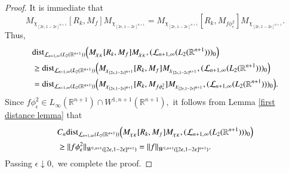 \documentclass[12pt]{amsart}
\begin{document}
\begin{proof}
It is immediate that
$$M_{\chi_{[2\epsilon,1-2\epsilon]^{n+1}}}[R_k,M_f]M_{\chi_{[2\epsilon,1-2\epsilon]^{n+1}}}=M_{\chi_{[2\epsilon,1-2\epsilon]^{n+1}}}[R_k,M_{f\phi_{\epsilon}^2}]M_{\chi_{[2\epsilon,1-2\epsilon]^{n+1}}}.$$
Thus,
\begin{align*}
&{\rm dist}_{\mathcal{L}_{n+1,\infty}(L_2(\mathbb{R}^{n+1}))}\Big(M_{\chi_K}[R_k,M_f]M_{\chi_K},(\mathcal{L}_{n+1,\infty}(L_2(\mathbb{R}^{n+1})))_0\Big)\\
&\geq {\rm dist}_{\mathcal{L}_{n+1,\infty}(L_2(\mathbb{R}^{n+1}))}\Big(M_{\chi_{[2\epsilon,1-2\epsilon]^{n+1}}}[R_k,M_f]M_{\chi_{[2\epsilon,1-2\epsilon]^{n+1}}},(\mathcal{L}_{n+1,\infty}(L_2(\mathbb{R}^{n+1})))_0\Big)\\
&={\rm dist}_{\mathcal{L}_{n+1,\infty}(L_2(\mathbb{R}^{n+1}))}\Big(M_{\chi_{[2\epsilon,1-2\epsilon]^{n+1}}}[R_k,M_{f\phi_{\epsilon}^2}]M_{\chi_{[2\epsilon,1-2\epsilon]^{n+1}}},(\mathcal{L}_{n+1,\infty}(L_2(\mathbb{R}^{n+1})))_0\Big).
\end{align*}
Since $f\phi_{\epsilon}^2\in L_{\infty}(\mathbb{R}^{n+1})\cap W^{1,n+1}(\mathbb{R}^{n+1}),$ it follows from Lemma \ref{first distance lemma} that
\begin{align*}
&C_n{\rm dist}_{\mathcal{L}_{n+1,\infty}(L_2(\mathbb{R}^{n+1}))}\Big(M_{\chi_K}[R_k,M_f]M_{\chi_K},(\mathcal{L}_{n+1,\infty}(L_2(\mathbb{R}^{n+1})))_0\Big)\\
&\geq \|f\phi_{\epsilon}^2\|_{\dot{W}^{1,n+1}([2\epsilon,1-2\epsilon]^{n+1})}=\|f\|_{\dot{W}^{1,n+1}([2\epsilon,1-2\epsilon]^{n+1})}.
\end{align*}
Passing $\epsilon\downarrow0,$ we complete the proof.
\end{proof}
%
\end{document}

